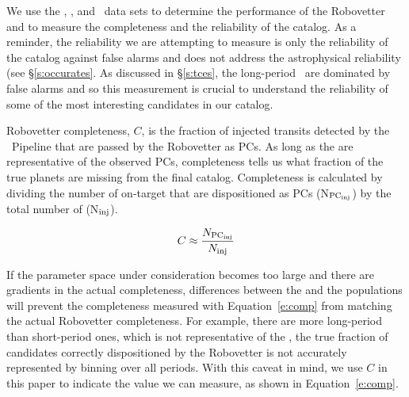 %

\newcommand{\opsfp}{N$_{\rm FP_{\rm obs}}$}
\newcommand{\opspc}{N$_{\rm PC_{\rm obs}}$}
\newcommand{\opsN}{N$_{\rm obs}$}
\newcommand{\trueopspc}{T$_{\rm PC_{\rm obs}}$}
\newcommand{\missedfp}{T$_{\rm FP_{\rm obs}}$ - N$_{\rm FP_{\rm obs}}$}
\newcommand{\invfp}{N$_{\rm FP_{\rm inv}}$}
\newcommand{\invpc}{N$_{\rm PC_{\rm inv}}$}
\newcommand{\invN}{N$_{\rm inv}$}
\newcommand{\sfatce}{sfaTCE}


We use the \injtce, \scrtce, and \invtce\ data sets to determine the performance of the Robovetter and to measure the completeness and the reliability of the catalog. As a reminder, the reliability we are attempting to measure is only the reliability of the catalog against false alarms and does not address the astrophysical reliability (see \S\ref{s:occurates}. As discussed in \S\ref{s:tces}, the long-period \opstces\ are dominated by false alarms and so this measurement is crucial to understand the reliability of some of the most interesting candidates in our catalog.

{\color{blue}
Robovetter completeness, $C$, is the fraction of injected transits detected by the \Kepler\ Pipeline that are passed by the Robovetter as PCs.  As long as the  are representative of the observed PCs, completeness tells us what fraction of the true planets are missing from the final catalog.  Completeness is calculated by dividing the number of on-target  that are dispositioned as PCs (N$_{\rm PC_{\rm inj}}$) by the total number of  (N$_{\rm inj}$).

\begin{equation}
C \approx \frac{N_{\rm PC_{\rm inj}}}{N_{\rm inj}}
\label{e:comp}
\end{equation}

\noindent If the parameter space under consideration becomes too large and there are gradients in the actual completeness, differences between the \injtce and the \opstce{} populations will prevent the completeness measured with Equation~\ref{e:comp} from matching the actual Robovetter completeness. For example, there are more long-period  than short-period ones, which is not representative of the , the true fraction of candidates correctly dispositioned by the Robovetter is not accurately represented by binning over all periods. With this caveat in mind, we use $C$ in this paper to indicate the value we can measure, as shown in Equation~\ref{e:comp}.

}

